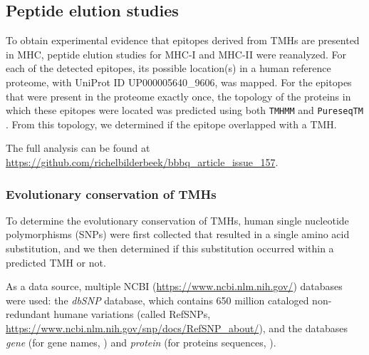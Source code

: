 \subsection{Peptide elution studies}\label{subsec:elution_studies}

To obtain experimental evidence that epitopes derived from TMHs are presented in MHC, 
peptide elution studies for MHC-I \cite{schellens2015comprehensive} 
and MHC-II \cite{bergseng2015different} were reanalyzed.
For each of the detected epitopes,
its possible location(s) in 
a human reference proteome,
with UniProt ID UP000005640\_9606, was mapped.
For the epitopes that were present in the proteome exactly once,
the topology of the proteins in which these epitopes were located 
was predicted using both \verb;TMHMM; \cite{krogh2001predicting} 
and \verb;PureseqTM; \cite{wang2019efficient}. 
From this topology, we determined if the epitope
overlapped with a TMH.

The full analysis can be found
at \url{https://github.com/richelbilderbeek/bbbq_article_issue_157}.

\subsubsection{Evolutionary conservation of TMHs}


To determine the evolutionary conservation of TMHs,
human single nucleotide polymorphisms (SNPs) were first collected
that resulted in a single amino acid substitution,
and we then determined if this substitution occurred within a predicted TMH or not.


As a data source, multiple
NCBI (\url{https://www.ncbi.nlm.nih.gov/}) databases were used: 
the \emph{dbSNP} \cite{sherry2001dbsnp} database,
which contains 650 million 
cataloged non-redundant humane variations (called RefSNPs,
\url{https://www.ncbi.nlm.nih.gov/snp/docs/RefSNP_about/}), and the databases \emph{gene} (for gene names, \cite{brown2015gene})
and \emph{protein} (for proteins sequences, \cite{sayers2010database}).

